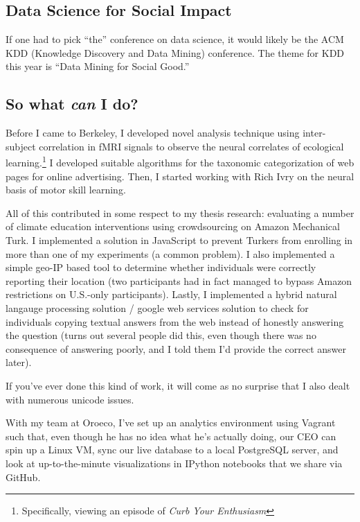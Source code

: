 \subsection*{Data Science for Social Impact}

If one had to pick “the” conference on data science, it would likely be the ACM KDD
(Knowledge Discovery and Data Mining) conference. The theme for KDD this year is
“Data Mining for Social Good.” 

\subsection*{So what \emph{can} I do?}


Before I came to Berkeley, I developed novel analysis technique using
inter-subject correlation in fMRI signals to observe the neural correlates of
ecological learning.\footnote{Specifically, viewing an episode of \emph{Curb
Your Enthusiasm}} I developed suitable algorithms for the taxonomic
categorization of web pages for online advertising. Then, I started working with
Rich Ivry on the neural basis of motor skill learning.

All of this contributed in some respect to my thesis research: evaluating a
number of climate education interventions using crowdsourcing on Amazon
Mechanical Turk. I implemented a solution in JavaScript to prevent Turkers from
enrolling in more than one of my experiments (a common problem). %
I also implemented a simple geo-IP based tool to determine whether individuals
were correctly reporting their location (two participants had in fact managed to
bypass Amazon restrictions on U.S.-only participants). Lastly, I implemented a
hybrid natural langauge processing solution / google web services solution to
check for individuals copying textual answers from the web instead of honestly
answering the question (turns out several people did this, even though there was
no consequence of answering poorly, and I told them I'd provide the correct
answer later).

If you've ever done this kind of work, it will come as no surprise that I also
dealt with numerous unicode issues.

With my team at Oroeco, I've set up an analytics environment using Vagrant such
that, even though he has no idea what he's actually doing, our CEO can spin up a
Linux VM, sync our live database to a local PostgreSQL server, and look at
up-to-the-minute visualizations in IPython notebooks that we share via GitHub.

